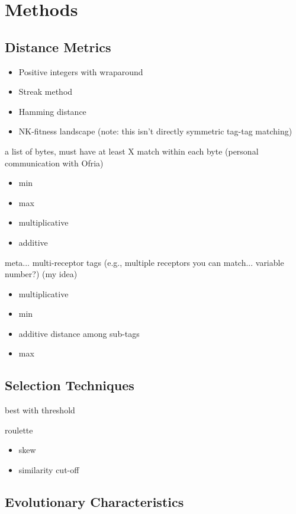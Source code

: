 \section{Methods}

\subsection{Distance Metrics}

\begin{itemize}
\item Positive integers with wraparound \citep{spector2011tag}
\item Streak method \citep{downing2015intelligence}
\item Hamming distance \citep{lalejini2019else}
\item NK-fitness landscape \citep{kauffman1987towards} (note: this isn't directly symmetric tag-tag matching)
\end{itemize}

a list of bytes, must have at least X match within each byte (personal communication with Ofria)
\begin{itemize}
\item min
\item max
\item multiplicative
\item additive
\end{itemize}

meta... multi-receptor tags (e.g., multiple receptors you can match... variable number?) (my idea)
\begin{itemize}
\item multiplicative
\item min
\item additive distance among sub-tags
\item max
\end{itemize}

\subsection{Selection Techniques}

best with threshold \citep{lalejini2019else}

roulette
\begin{itemize}
\item skew
\item similarity cut-off
\end{itemize}

\subsection{Evolutionary Characteristics}

